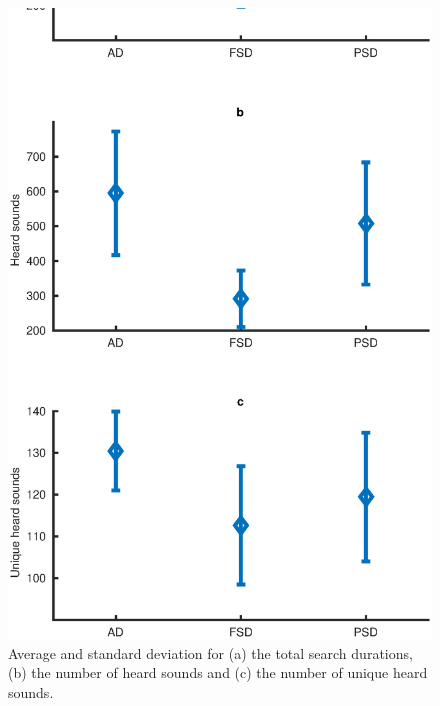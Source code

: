 \documentclass{aes2e}
\begin{document}
\begin{figure}[t]
\begin{center}
\includegraphics[scale=0.4]{gfx/analyse_music1.eps} 
\end{center}
\caption{\label{fig1Music} Average and standard deviation for (a) the total search durations, (b) the number of heard sounds and (c) the number of unique heard sounds.}
\end{figure}  
\end{document}
